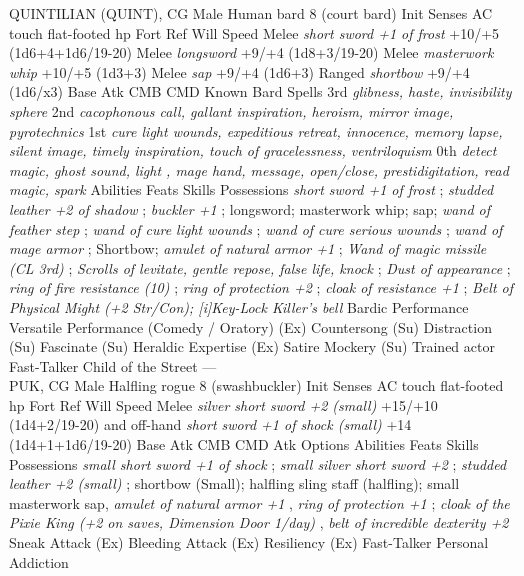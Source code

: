 QUINTILIAN (QUINT), CG Male Human bard 8 (court bard)  Init Senses  AC touch flat-footed  hp  Fort Ref Will  Speed  Melee  {\itshape short sword +1 of frost} +10/+5 (1d6+4+1d6/19-20)  Melee  {\itshape longsword} +9/+4 (1d8+3/19-20)  Melee  {\itshape masterwork whip} +10/+5 (1d3+3)  Melee  {\itshape sap} +9/+4 (1d6+3)  Ranged  {\itshape shortbow} +9/+4 (1d6/x3)  Base Atk CMB CMD  Known Bard Spells  3rd  {\itshape glibness, haste, invisibility sphere}   2nd  {\itshape cacophonous call, gallant inspiration, heroism, mirror image, pyrotechnics}   1st  {\itshape cure light wounds, expeditious retreat, innocence, memory lapse, silent image, timely inspiration, touch of gracelessness, ventriloquism}   0th  {\itshape detect magic, ghost sound, light , mage hand, message, open/close, prestidigitation, read magic, spark}   Abilities  Feats  Skills  Possessions  {\itshape short sword +1 of frost} ;  {\itshape studded leather +2 of shadow} ;  {\itshape buckler +1} ; longsword; masterwork whip; sap;  {\itshape wand of feather step} ;  {\itshape wand of cure light wounds} ;  {\itshape wand of cure serious wounds} ;  {\itshape wand of mage armor} ; Shortbow;  {\itshape amulet of natural armor +1} ;  {\itshape Wand of magic missile (CL 3rd)} ;  {\itshape Scrolls of levitate, gentle repose, false life, knock} ;  {\itshape Dust of appearance} ;  {\itshape ring of fire resistance (10)} ;  {\itshape ring of protection +2} ;  {\itshape cloak of resistance +1} ;  {\itshape Belt of Physical Might (+2 Str/Con);  [i]Key-Lock Killer's bell}  Bardic Performance  Versatile Performance (Comedy / Oratory) (Ex)  Countersong (Su)  Distraction (Su)  Fascinate (Su)  Heraldic Expertise (Ex)  Satire  Mockery (Su) Trained actor  Fast-Talker  Child of the Street ---\\

PUK, CG Male Halfling rogue 8 (swashbuckler)  Init Senses  AC touch flat-footed  hp  Fort Ref Will  Speed  Melee  {\itshape silver short sword +2 (small)} +15/+10 (1d4+2/19-20) and off-hand  {\itshape short sword +1 of shock (small)} +14 (1d4+1+1d6/19-20)  Base Atk CMB CMD  Atk Options  Abilities  Feats  Skills  Possessions  {\itshape small short sword +1 of shock} ;  {\itshape small silver short sword +2} ;  {\itshape studded leather +2 (small)} ; shortbow (Small); halfling sling staff (halfling); small masterwork sap,  {\itshape amulet of natural armor +1} ,  {\itshape ring of protection +1} ;  {\itshape cloak of the Pixie King (+2 on saves, Dimension Door 1/day)} ,  {\itshape belt of incredible dexterity +2}  Sneak Attack (Ex)  Bleeding Attack (Ex)  Resiliency (Ex) Fast-Talker  Personal Addiction 